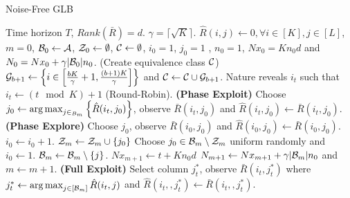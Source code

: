 \begin{algorithm}[!th]
\caption{Noise-Free GLB}
\label{alg:NFGLB}
\begin{algorithmic}[1]
 Time horizon $T$, $Rank(\bar{R}) = d$.
 $\gamma = \lceil\sqrt{K} \rceil$.
 $\hat{R}(i,j) \leftarrow 0, \forall i\in [K], j\in [L]$, $m=0$, $\mathcal{B}_0 \leftarrow \mathcal{A}$, $\mathcal{Z}_0 \leftarrow \emptyset$, $\mathcal{C} \leftarrow \emptyset$,  $i_0=1$, $j_0=1$ , $n_0 = 1 $, $Nx_0 = K n_0 d$ and $N_0 = Nx_0+ \gamma |\mathcal{B}_0|n_0$.
 (Create equivalence class $\mathcal{C}$)
\State  $\mathcal{G}_{b+1}\leftarrow \left\lbrace i\in \left[\frac{bK}{\gamma}+1,\frac{(b+1)K}{\gamma}\right]\right\rbrace$ and $\mathcal{C}\leftarrow \mathcal{C}\cup \mathcal{G}_{b+1}$.
\EndFor
{}	
\State Nature reveals $i_t$ such that $i_t \leftarrow (t \mod K) + 1$ (Round-Robin).
  \textbf{ (Phase Exploit) }
\State Choose $j_0\leftarrow \mathop{\rm arg\,max}_{j\in_{B_m}}\left\lbrace \hat{R}(i_t,j_0)\right\rbrace $, observe $\bar{R}(i_t,j_0)$ and $\hat{R}(i_t,j_0)\leftarrow \bar{R}(i_t,j_0)$.
  \textbf{ (Phase Explore) }
\State Choose $j_0$, observe $\bar{R}(i_0,j_0)$ and $\hat{R}(i_0,j_0)\leftarrow \bar{R}(i_0,j_0)$.
\State $i_0 \leftarrow i_0 + 1$.
\Else
\State $\mathcal{Z}_m \leftarrow \mathcal{Z}_m \cup \lbrace j_0\rbrace$
\State Choose $j_0\in\mathcal{B}_m\setminus \mathcal{Z}_m$ uniform randomly and $i_0 \leftarrow 1$.
\EndIf
\Else
\ColElim
\State {}
\State {}
\State $\mathcal{B}_m \leftarrow \mathcal{B}_m \setminus \lbrace j \rbrace$. 
\EndWhile
\EndFor
\EndColElim
\ResParam
\State $Nx_{m + 1}  \leftarrow t + K n_0 d$
\State $N_{m+1} \leftarrow Nx_{m + 1} + \gamma |\mathcal{B}_m|n_0$ and $m \leftarrow m + 1$.
\EndResParam
\EndIf
\Else \textbf{ (Full Exploit) }
\State  Select column $j_t^*$, observe $\bar{R}(i_t,j_t^*)$ where $j_t^* \leftarrow \mathop{\rm arg\,max}_{j\in[\mathcal{B}_m]} {\hat{R}(i_t,j)}$ and $\hat{R}(i_t,,j_t^*)\leftarrow \bar{R}(i_t,,j_t^*)$.
\EndIf
\EndFor
\end{algorithmic}
\end{algorithm}


